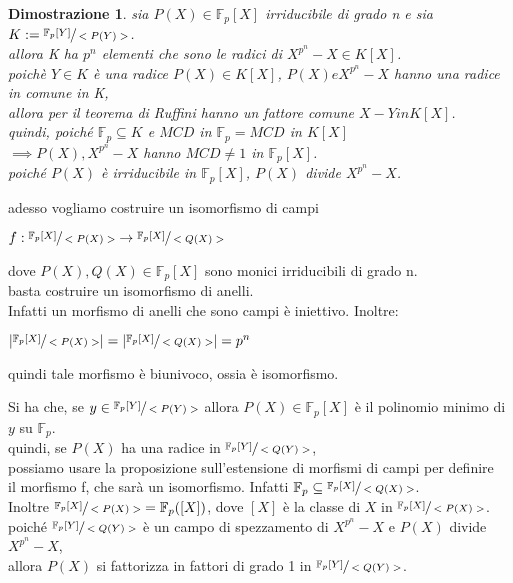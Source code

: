 \documentclass[a4paper,12pt]{article}
\theoremstyle{def}
\theoremstyle{prop}
\theoremstyle{esempio}
\theoremstyle{dimostrazione}
\newtheorem*{dimostrazione}{Dimostrazione}
\theoremstyle{teo}
\theoremstyle{osservazione}
\begin{document}
\begin{dimostrazione}
	sia \(P(X) \in \mathbb{F}_p[X]\) irriducibile di grado n e sia \(K := \sfrac{\mathbb{F}_p[Y]}{<P(Y)>}\).\\
	allora K ha \(p^n\) elementi che sono le radici di \(X^{p^n} - X \in K[X]\).\\
	poichè \(Y \in K\) è una radice \(P(X) \in K[X]\), \(P(X) e X^{p^n} - X\) hanno una radice in comune in K,\\
	allora per il teorema di Ruffini hanno un fattore comune \(X - Y in K[X]\).\\
	quindi, poiché \(\mathbb{F}_p \subseteq K\) e \(MCD\) in \(\mathbb{F}_p = MCD\) in \(K[X]\)\\
	\(\implies P(X), X^{p^n} - X\) hanno \(MCD \neq 1\) in \(\mathbb{F}_p[X]\).\\
	poiché \(P(X)\) è irriducibile in \(\mathbb{F}_p[X]\), \(P(X)\) divide \(X^{p^n} - X\).\\
\end{dimostrazione}

\vspace{\baselineskip}

adesso vogliamo costruire un isomorfismo di campi
\begin{center}
	\(f: \sfrac{\mathbb{F}_p[X]}{<P(X)>} \rightarrow \sfrac{\mathbb{F}_p[X]}{<Q(X)>}\)
\end{center}
dove \(P(X), Q(X) \in \mathbb{F}_p[X]\) sono monici irriducibili di grado n.\\
basta costruire un isomorfismo di anelli.\\
Infatti un morfismo di anelli che sono campi è iniettivo. Inoltre:
\begin{center}
	\(|\sfrac{\mathbb{F}_p[X]}{<P(X)>}| = |\sfrac{\mathbb{F}_p[X]}{<Q(X)>}| = p^n\)
\end{center}

quindi tale morfismo è biunivoco, ossia è isomorfismo.

\vspace{\baselineskip}

Si ha che, se \(y \in \sfrac{\mathbb{F}_p[Y]}{<P(Y)>}\) allora \(P(X) \in \mathbb{F}_p[X]\) è il polinomio minimo di \(y\) su \(\mathbb{F}_p\).\\
quindi, se \(P(X)\) ha una radice in \(\sfrac{\mathbb{F}_p[Y]}{<Q(Y)>}\),\\
possiamo usare la proposizione sull'estensione di morfismi di campi per definire\\
il morfismo f, che sarà un isomorfismo. Infatti \(\mathbb{F}_p \subseteq \sfrac{\mathbb{F}_p[X]}{<Q(X)>}\). \\
Inoltre \(\sfrac{\mathbb{F}_p[X]}{<P(X)>} = \mathbb{F}_p([X])\), dove \([X]\) è la classe di \(X\) in \(\sfrac{\mathbb{F}_p[X]}{<P(X)>}\).\\
poiché \(\sfrac{\mathbb{F}_p[Y]}{<Q(Y)>}\) è un campo di spezzamento di \(X^{p^n} - X\) e \(P(X)\) divide \(X^{p^n} - X\),\\
allora \(P(X)\) si fattorizza in fattori di grado 1 in \(\sfrac{\mathbb{F}_p[Y]}{<Q(Y)>}\).
\end{document}
